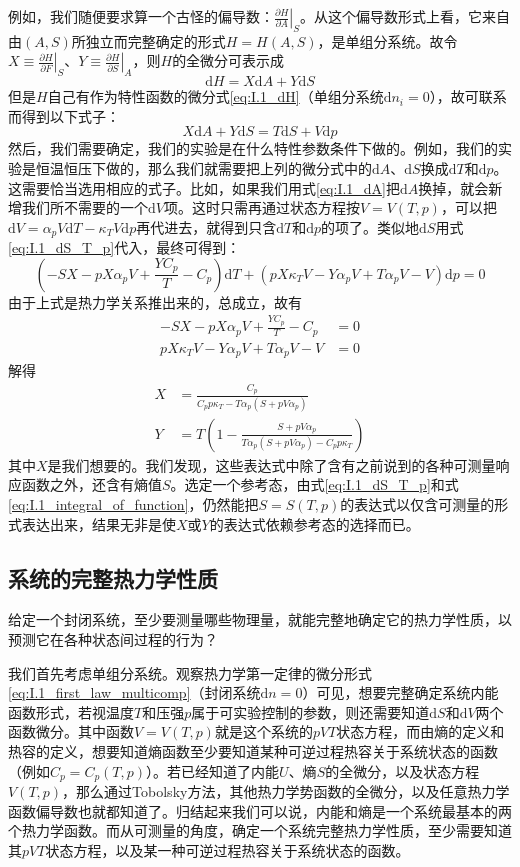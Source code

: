 \documentclass[main.tex]{subfiles}
\begin{document}
例如，我们随便要求算一个古怪的偏导数：$\left.\frac{\partial H}{\partial A}\right|_{S}$。从这个偏导数形式上看，它来自由$\left(A,S\right)$所独立而完整确定的形式$H=H\left(A,S\right)$，是单组分系统。故令$X\equiv\left.\frac{\partial H}{\partial F}\right|_{S}$、$Y\equiv\left.\frac{\partial H}{\partial S}\right|_{A}$，则$H$的全微分可表示成
\[\mathrm{d}H=X\mathrm{d}A+Y\mathrm{d}S\]
但是$H$自己有作为特性函数的微分式\eqref{eq:I.1_dH}（单组分系统$\mathrm{d}n_i=0$），故可联系而得到以下式子：
\[X\mathrm{d}A+Y\mathrm{d}S=T\mathrm{d}S+V\mathrm{d}p\]
然后，我们需要确定，我们的实验是在什么特性参数条件下做的。例如，我们的实验是恒温恒压下做的，那么我们就需要把上列的微分式中的$\mathrm{d}A$、$\mathrm{d}S$换成$\mathrm{d}T$和$\mathrm{d}p$。这需要恰当选用相应的式子。比如，如果我们用式\eqref{eq:I.1_dA}把$\mathrm{d}A$换掉，就会新增我们所不需要的一个$\mathrm{d}V$项。这时只需再通过状态方程按$V=V\left(T,p\right)$，可以把$\mathrm{d}V=\alpha_pV\mathrm{d}T-\kappa_TV\mathrm{d}p$再代进去，就得到只含$\mathrm{d}T$和$\mathrm{d}p$的项了。类似地$\mathrm{d}S$用式\eqref{eq:I.1_dS_T_p}代入，最终可得到：
\[\left(-SX-pX\alpha_pV+\frac{YC_p}{T}-C_p\right)\mathrm{d}T+\left(pX\kappa_TV-Y\alpha_pV+T\alpha_pV-V\right)\mathrm{d}p=0\]
由于上式是热力学关系推出来的，总成立，故有
\begin{align*}
  -SX-pX\alpha_pV+\frac{YC_p}{T}-C_p  & =0 \\
  pX\kappa_TV-Y\alpha_pV+T\alpha_pV-V & =0
\end{align*}
解得
\begin{align*}
  X & =\frac{C_p}{C_p p \kappa_T-T\alpha_p\left(S+pV\alpha_p\right)}                          \\
  Y & =T\left(1-\frac{S+p V \alpha_p}{T\alpha_p\left(S+pV\alpha_p\right)-C_pp\kappa_T}\right)
\end{align*}
其中$X$是我们想要的。我们发现，这些表达式中除了含有之前说到的各种可测量响应函数之外，还含有熵值$S$。选定一个参考态，由式\eqref{eq:I.1_dS_T_p}和式\eqref{eq:I.1_integral_of_function}，仍然能把$S=S\left(T,p\right)$的表达式以仅含可测量的形式表达出来，结果无非是使$X$或$Y$的表达式依赖参考态的选择而已。

\subsection{系统的完整热力学性质}
给定一个封闭系统，至少要测量哪些物理量，就能完整地确定它的热力学性质，以预测它在各种状态间过程的行为？

我们首先考虑单组分系统。观察热力学第一定律的微分形式\eqref{eq:I.1_first_law_multicomp}（封闭系统$\mathrm{d}n=0$）可见，想要完整确定系统内能函数形式，若视温度$T$和压强$p$属于可实验控制的参数，则还需要知道$\mathrm{d}S$和$\mathrm{d}V$两个函数微分。其中函数$V=V\left(T,p\right)$就是这个系统的$pVT$状态方程，而由熵的定义和热容的定义，想要知道熵函数至少要知道某种可逆过程热容关于系统状态的函数（例如$C_p=C_p\left(T,p\right)$）。若已经知道了内能$U$、熵$S$的全微分，以及状态方程$V\left(T,p\right)$，那么通过Tobolsky方法，其他热力学势函数的全微分，以及任意热力学函数偏导数也就都知道了。归结起来我们可以说，内能和熵是一个系统最基本的两个热力学函数。而从可测量的角度，确定一个系统完整热力学性质，至少需要知道其$pVT$状态方程，以及某一种可逆过程热容关于系统状态的函数。
\end{document}
